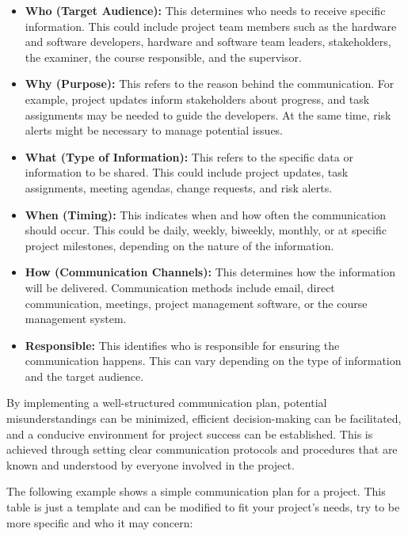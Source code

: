 \documentclass[10pt]{projectdoc}
\begin{document}
\begin{itemize}
\item \textbf{Who (Target Audience):} This determines who needs to receive specific information. This could include project team members such as the hardware and software developers, hardware and software team leaders, stakeholders, the examiner, the course responsible, and the supervisor.
\item \textbf{Why (Purpose):} This refers to the reason behind the communication. For example, project updates inform stakeholders about progress, and task assignments may be needed to guide the developers. At the same time, risk alerts might be necessary to manage potential issues.
\item \textbf{What (Type of Information):} This refers to the specific data or information to be shared. This could include project updates, task assignments, meeting agendas, change requests, and risk alerts.
\item \textbf{When (Timing):} This indicates when and how often the communication should occur. This could be daily, weekly, biweekly, monthly, or at specific project milestones, depending on the nature of the information.
\item \textbf{How (Communication Channels):} This determines how the information will be delivered. Communication methods include email, direct communication, meetings, project management software, or the course management system.
\item \textbf{Responsible:} This identifies who is responsible for ensuring the communication happens. This can vary depending on the type of information and the target audience.
\end{itemize}

By implementing a well-structured communication plan, potential misunderstandings can be minimized, efficient decision-making can be facilitated, and a conducive environment for project success can be established. This is achieved through setting clear communication protocols and procedures that are known and understood by everyone involved in the project.

The following example shows a simple communication plan for a project. This table is just a template and can be modified to fit your project’s needs, try to be more specific and who it may concern:
\end{document}
